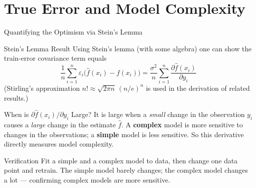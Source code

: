 \documentclass{beamer}
\begin{document}
\section{True Error and Model Complexity}

\begin{frame}[shrink=10]{Quantifying the Optimism via Stein's Lemma}
  \begin{block}{Stein's Lemma Result}
    Using Stein's lemma (with some algebra) one can show the train-error
    covariance term equals
    \[
      \boxed{\;
        \frac{1}{n}\sum_{i=1}^{n}\varepsilon_i\bigl(\hat f(x_i) - f(x_i)\bigr)
          = \frac{\sigma^2}{n}\sum_{i=1}^{n}\frac{\partial \hat f(x_i)}{\partial y_i}
      \;}
    \]
    (Stirling's approximation $n! \approx \sqrt{2\pi n}\,(n/e)^n$ is used in
    the derivation of related results.)
  \end{block}

  \begin{block}{When is $\partial\hat f(x_i)/\partial y_i$ Large?}
    It is large when a \emph{small} change in the observation $y_i$ causes a
    \emph{large} change in the estimate $\hat f$. A \textbf{complex} model
    is more sensitive to changes in the observations; a \textbf{simple}
    model is less sensitive. So this derivative directly measures model
    complexity.
  \end{block}

  \begin{exampleblock}{Verification}
    Fit a simple and a complex model to data, then change one data point
    and retrain. The simple model barely changes; the complex model changes
    a lot --- confirming complex models are more sensitive.
  \end{exampleblock}
\end{frame}
\end{document}
